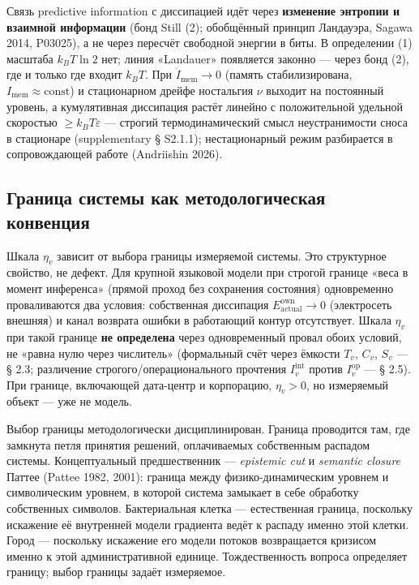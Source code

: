 \documentclass[pdflatex,sn-mathphys-ay]{sn-jnl}
\begin{document}
Связь predictive information с диссипацией идёт через \textbf{изменение энтропии и взаимной информации} (бонд Still (2); обобщённый принцип Ландауэра, Sagawa 2014, P03025), а не через пересчёт свободной энергии в биты. В определении (1) масштаба \(k_B T \ln 2\) нет; линия «Landauer» появляется законно --- через бонд (2), где и только где входит \(k_B T\). При \(\dot I_{\text{mem}} \to 0\) (память стабилизирована, \(I_{\text{mem}} \approx \text{const}\)) и стационарном дрейфе ностальгия \(\nu\) выходит на постоянный уровень, а кумулятивная диссипация растёт линейно с положительной удельной скоростью \(\ge k_B T \varepsilon\) --- строгий термодинамический смысл неустранимости сноса в стационаре (supplementary § S2.1.1); нестационарный режим разбирается в сопровождающей работе (Andriishin 2026).

\subsection{Граница системы как методологическая конвенция}\label{ux433ux440ux430ux43dux438ux446ux430-ux441ux438ux441ux442ux435ux43cux44b-ux43aux430ux43a-ux43cux435ux442ux43eux434ux43eux43bux43eux433ux438ux447ux435ux441ux43aux430ux44f-ux43aux43eux43dux432ux435ux43dux446ux438ux44f}

Шкала \(\eta_v\) зависит от выбора границы измеряемой системы. Это структурное свойство, не дефект. Для крупной языковой модели при строгой границе «веса в момент инференса» (прямой проход без сохранения состояния) одновременно проваливаются два условия: собственная диссипация \(E_{\text{actual}}^{\text{own}} \to 0\) (электросеть внешняя) и канал возврата ошибки в работающий контур отсутствует. Шкала \(\eta_v\) при такой границе \textbf{не определена} через одновременный провал обоих условий, не «равна нулю через числитель» (формальный счёт через ёмкости \(T_v\), \(C_v\), \(S_v\) --- § 2.3; различение строгого/операционального прочтения \(I_v^{\text{int}}\) против \(I_v^{\text{op}}\) --- § 2.5). При границе, включающей дата-центр и корпорацию, \(\eta_v > 0\), но измеряемый объект --- уже не модель.

Выбор границы методологически дисциплинирован. Граница проводится там, где замкнута петля принятия решений, оплачиваемых собственным распадом системы. Концептуальный предшественник --- \emph{epistemic cut} и \emph{semantic closure} Паттее (Pattee 1982, 2001): граница между физико-динамическим уровнем и символическим уровнем, в которой система замыкает в себе обработку собственных символов. Бактериальная клетка --- естественная граница, поскольку искажение её внутренней модели градиента ведёт к распаду именно этой клетки. Город --- поскольку искажение его модели потоков возвращается кризисом именно к этой административной единице. Тождественность вопроса определяет границу; выбор границы задаёт измеряемое.
\end{document}
